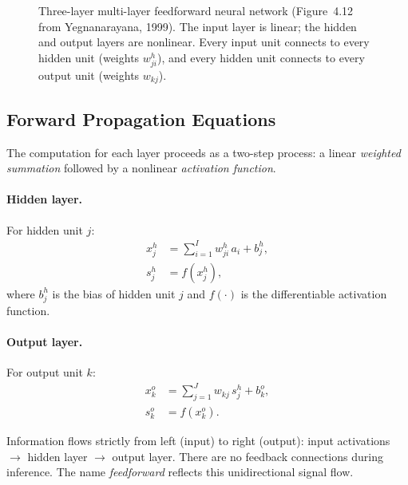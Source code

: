 \documentclass[12pt,a4paper]{article}
\begin{document}
\begin{figure}[htbp]
\caption{Three-layer multi-layer feedforward neural network (Figure~4.12 from
  Yegnanarayana, 1999).  The input layer is linear; the hidden and output
  layers are nonlinear.  Every input unit connects to every hidden unit
  (weights $w_{ji}^h$), and every hidden unit connects to every output unit
  (weights $w_{kj}$).}
\label{fig:threelayer}
\end{figure}

\subsection{Forward Propagation Equations}
\label{subsec:forward-eqs}

The computation for each layer proceeds as a two-step process: a linear
\emph{weighted summation} followed by a nonlinear \emph{activation function}.

\paragraph{Hidden layer.}
For hidden unit $j$:
\begin{align}
  x_j^h &= \sum_{i=1}^{I} w_{ji}^h\, a_i + b_j^h,
  \label{eq:hidden-net} \\
  s_j^h &= f\!\left(x_j^h\right),
  \label{eq:hidden-act}
\end{align}
where $b_j^h$ is the bias of hidden unit $j$ and $f(\cdot)$ is the
differentiable activation function.

\paragraph{Output layer.}
For output unit $k$:
\begin{align}
  x_k^o &= \sum_{j=1}^{J} w_{kj}\, s_j^h + b_k^o,
  \label{eq:output-net} \\
  s_k^o &= f\!\left(x_k^o\right).
  \label{eq:output-act}
\end{align}

\begin{keyinsight}[title=Why ``Feedforward''?]
  Information flows strictly from left (input) to right (output): input
  activations $\to$ hidden layer $\to$ output layer.  There are no feedback
  connections during inference.  The name \emph{feedforward} reflects this
  unidirectional signal flow.
\end{keyinsight}
\end{document}

